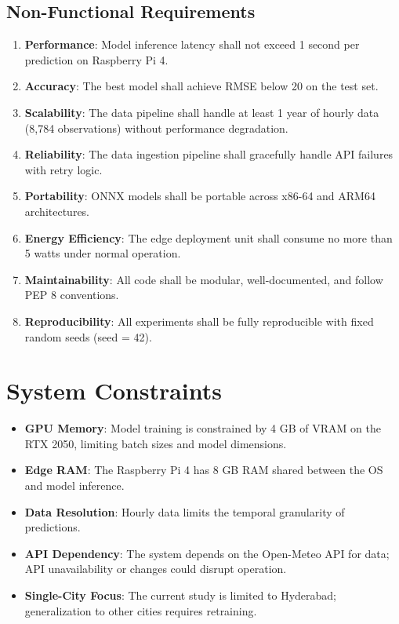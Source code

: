 \subsection{Non-Functional Requirements}

\begin{enumerate}[label=NFR-\arabic*]
    \item \textbf{Performance}: Model inference latency shall not exceed 1 second per prediction on Raspberry Pi 4.
    \item \textbf{Accuracy}: The best model shall achieve RMSE below 20 on the test set.
    \item \textbf{Scalability}: The data pipeline shall handle at least 1 year of hourly data (8,784 observations) without performance degradation.
    \item \textbf{Reliability}: The data ingestion pipeline shall gracefully handle API failures with retry logic.
    \item \textbf{Portability}: ONNX models shall be portable across x86-64 and ARM64 architectures.
    \item \textbf{Energy Efficiency}: The edge deployment unit shall consume no more than 5 watts under normal operation.
    \item \textbf{Maintainability}: All code shall be modular, well-documented, and follow PEP 8 conventions.
    \item \textbf{Reproducibility}: All experiments shall be fully reproducible with fixed random seeds (seed = 42).
\end{enumerate}

\section{System Constraints}

\begin{itemize}
    \item \textbf{GPU Memory}: Model training is constrained by 4 GB of VRAM on the RTX 2050, limiting batch sizes and model dimensions.
    \item \textbf{Edge RAM}: The Raspberry Pi 4 has 8 GB RAM shared between the OS and model inference.
    \item \textbf{Data Resolution}: Hourly data limits the temporal granularity of predictions.
    \item \textbf{API Dependency}: The system depends on the Open-Meteo API for data; API unavailability or changes could disrupt operation.
    \item \textbf{Single-City Focus}: The current study is limited to Hyderabad; generalization to other cities requires retraining.
\end{itemize}

